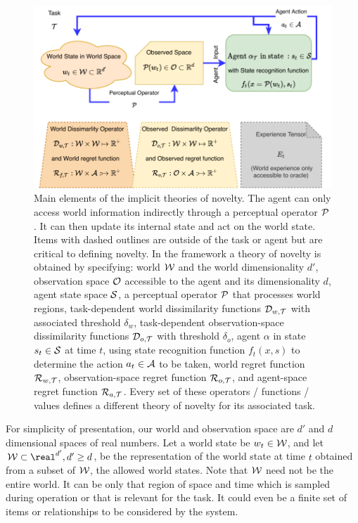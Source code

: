  
\begin{figure}[t]
 \centering
    \includegraphics[width=\columnwidth]{Elements-of-novelty.pdf}
   \caption{Main elements of the implicit theories of novelty. The agent can only access world information indirectly through a perceptual operator ${\cal P}$. It can then update its internal state and act on the world state. Items with dashed outlines are outside of the task or agent but are critical to defining novelty.
In the framework a theory of novelty is obtained by specifying:
world $\cal W$ and the world dimensionality $d'$,
observation space ${\cal O}$ accessible to the agent and its dimensionality $d$, agent state space $\cal S$,
a perceptual operator ${\cal P}$ that processes world regions,
task-dependent world dissimilarity functions ${\cal D}_{w,{\cal T}}$ with associated threshold $\delta_w$,
task-dependent observation-space dissimilarity functions ${\cal D}_{o,{\cal T}}$ with threshold $\delta_o$,
agent $\alpha$ in state $s_t\in{\cal S}$ at time $t$, using
state recognition function $f_t(x,s)$ to determine the action $a_t \in{\cal A} $ to be taken, 
world regret function ${\cal R}_{w,{\cal T}}$, 
observation-space regret function ${\cal R}_{o,{\cal T}}$,
and agent-space regret function ${\cal R}_{a,{\cal T}}$. 
Every  set of these operators / functions / values defines a different theory of novelty for its associated task. 
}
\label{fig:elements}
\end{figure}




For simplicity of presentation, our world and observation space are $d'$ and $d$ dimensional spaces of real numbers. Let a world state be $w_t\in {\cal W}$, and let ${\cal W} \subset \real^{d'}, d'\ge d$, be the representation of the world state at time $t$ obtained from a subset of ${\cal W}$, the allowed world states. 
Note that $\cal W$ need not be the entire world. It can be only that region of space and time which is sampled during operation or that is relevant for the task. It could even be a finite set of items or relationships to be considered by the system. 


